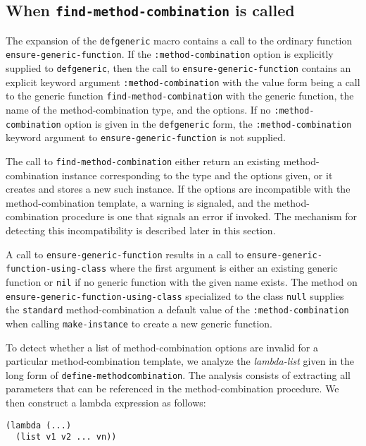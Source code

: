 \subsection{When \texttt{find-method-combination} is called}

The expansion of the \texttt{defgeneric} macro contains a call to the
ordinary function \texttt{ensure-generic-function}.  If the
\texttt{:method-combination} option is explicitly supplied to
\texttt{defgeneric}, then the call to \texttt{ensure-generic-function}
contains an explicit keyword argument \texttt{:method-combination}
with the value form being a call to the generic function
\texttt{find-method-combination} with the generic function, the name
of the method-combination type, and the options.  If no
\texttt{:method-combination} option is given in the
\texttt{defgeneric} form, the \texttt{:method-combination} keyword
argument to \texttt{ensure-generic-function} is not supplied.

The call to \texttt{find-method-combination} either return an existing
method-combination instance corresponding to the type and the options
given, or it creates and stores a new such instance.  If the options
are incompatible with the method-combination template, a warning is
signaled, and the method-combination procedure is one that signals an
error if invoked.  The mechanism for detecting this incompatibility is
described later in this section.

A call to \texttt{ensure-generic-function} results in a call to
\texttt{ensure-generic-function-using-class} where the first argument
is either an existing generic function or \texttt{nil} if no generic
function with the given name exists.  The method on
\texttt{ensure-generic-function-using-class} specialized to the class
\texttt{null} supplies the \texttt{standard} method-combination a
default value of the \texttt{:method-combination} when calling
\texttt{make-instance} to create a new generic function.

To detect whether a list of method-combination options are invalid for
a particular method-combination template, we analyze the
\emph{lambda-list} given in the long form of
\texttt{define-method\-combination}.  The analysis consists of
extracting all parameters that can be referenced in the
method-combination procedure.  We then construct a lambda expression
as follows:

\begin{verbatim}
(lambda (...)
  (list v1 v2 ... vn))
\end{verbatim}

